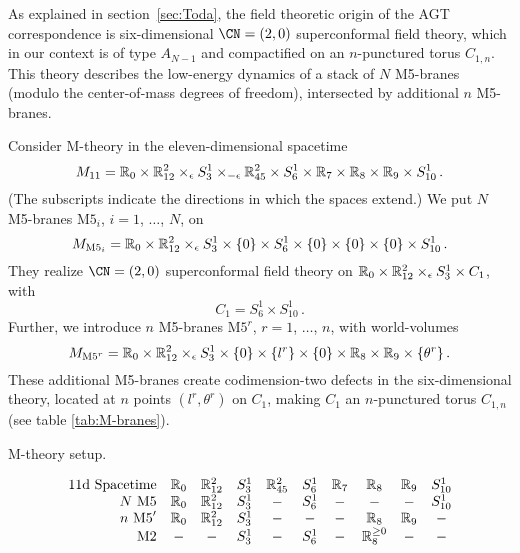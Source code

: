As explained in section~\ref{sec:Toda}, the field theoretic origin of
the AGT correspondence is six-dimensional $\CN = (2,0)$ superconformal
field theory, which in our context is of type $A_{N-1}$ and
compactified on an $n$-punctured torus $C_{1,n}$.  This theory
describes the low-energy dynamics of a stack of $N$ M5-branes (modulo
the center-of-mass degrees of freedom), intersected by additional $n$ M5-branes.

Consider M-theory in the eleven-dimensional spacetime
\begin{equation}
  M_{11}
  =
  \mathbb{R}_0 \times \mathbb{R}^2_{12} \times_\epsilon S^1_3 \times_{-\epsilon} \mathbb{R}^2_{45}
  \times S^1_6 \times \mathbb{R}_7 \times \mathbb{R}_8 \times \mathbb{R}_9 \times S^1_{10} \,.
\end{equation}
(The subscripts indicate the directions in which the spaces extend.)
We put $N$ M5-branes $\mathrm{M5}_i$, $i = 1$, $\dotsc$, $N$, on
\begin{equation}
  M_{\mathrm{M5}_i} =
  \mathbb{R}_0 \times \mathbb{R}^2_{12} \times_\epsilon S^1_3 \times \{0\}
  \times S^1_6 \times \{0\} \times \{0\} \times \{0\} \times S^1_{10} \,.
\end{equation}
They realize $\CN = (2,0)$ superconformal field theory on
$\mathbb{R}_0 \times \mathbb{R}^2_{12} \times_\epsilon S^1_3 \times C_1$, with
\begin{equation}
  C_1 = S^1_6 \times S^1_{10} \,.
\end{equation}
Further, we introduce $n$ M5-branes $\mathrm{M5}^r$, $r = 1$,
$\dotsc$, $n$, with world-volumes
\begin{equation}
  M_{\mathrm{M5}^r} =
  \mathbb{R}_0 \times \mathbb{R}^2_{12} \times_\epsilon S^1_3 \times \{0\}
  \times \{l^r\} \times \{0\} \times \mathbb{R}_8 \times \mathbb{R}_9 \times \{\theta^r\} \,.
\end{equation}
These additional M5-branes create codimension-two defects in the six-dimensional
theory, located at $n$ points $(l^r,\theta^r)$ on $C_1$, making $C_1$
an $n$-punctured torus $C_{1,n}$ (see table \ref{tab:M-branes}).


\begin{table}
  \caption{M-theory setup.}
  \vspace{-0.5cm}
    \centering
    \begin{equation*}
      \begin{array}{rccccccccc}
        \text{11d Spacetime} & \mathbb{R}_0 & \mathbb{R}_{12}^2 & S_3^1 & \mathbb{R}_{45}^2 & S_6^1 & \mathbb{R}_{7} & \mathbb{R}_{8} & \mathbb{R}_{9} & S_{10}^1 \\
        N \text{ M5}         & \mathbb{R}_0 & \mathbb{R}_{12}^2 & S_3^1 & - & S_6^1 & - & - & - & S_{10}^1 \\
        n \text{ M5}'        & \mathbb{R}_0 & \mathbb{R}_{12}^2 & S_3^1 & - & - & - & \mathbb{R}_8 & \mathbb{R}_9 & - \\
        \text{M2}            & - & - & S_3^1 & - & S_6^1 & - & \mathbb{R}_8^{\geq 0} & - & -
      \end{array}
    \end{equation*}
\label{tab:M-branes}
\end{table}


